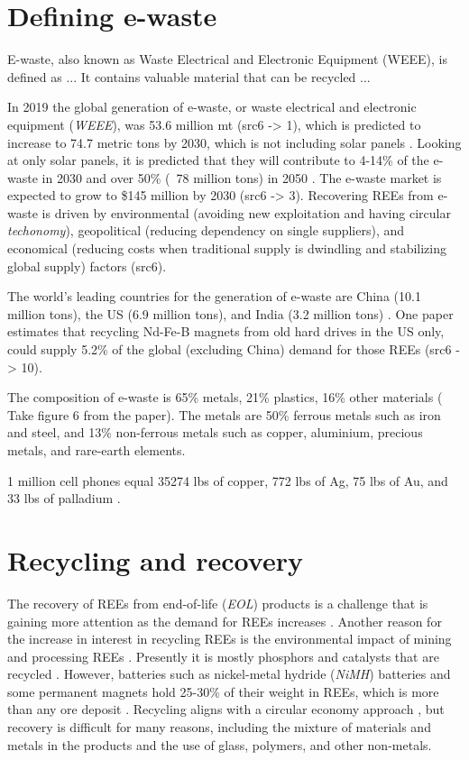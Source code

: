 
\section{Defining e-waste}

E-waste, also known as Waste Electrical and Electronic Equipment (WEEE), is defined as ... 
It contains valuable material that can be recycled ...

In 2019 the global generation of e-waste, or waste electrical and electronic equipment (\textit{WEEE}), was 53.6 million mt (src6 -> 1), which is predicted to increase to 74.7 metric tons by 2030, which is not including solar panels \cite{javed2024}. Looking at only solar panels, it is predicted that they will contribute to 4-14\% of the e-waste in 2030 and over 50\% (~78 million tons) in 2050 \cite{javed2024}. The e-waste market is expected to grow to \$145 million by 2030 (src6 -> 3). Recovering REEs from e-waste is driven by environmental (avoiding new exploitation and having circular \textit{techonomy}), geopolitical (reducing dependency on single suppliers), and economical (reducing costs when traditional supply is dwindling and stabilizing global supply) factors (src6).

The world's leading countries for the generation of e-waste are China (10.1 million tons), the US (6.9 million tons), and India (3.2 million tons) \cite{javed2024}. One paper estimates that recycling Nd-Fe-B magnets from old hard drives in the US only, could supply 5.2\% of the global (excluding China) demand for those REEs (src6 -> 10).

The composition of e-waste is 65\% metals, 21\% plastics, 16\% other materials (\cite{javed2024} Take figure 6 from the paper). The metals are 50\% ferrous metals such as iron and steel, and 13\% non-ferrous metals such as copper, aluminium, precious metals, and rare-earth elements. 

1 million cell phones equal 35274 lbs of copper, 772 lbs of Ag, 75 lbs of Au, and 33 lbs of palladium \cite{javed2024}.

\section{Recycling and recovery}

The recovery of REEs from end-of-life (\textit{EOL}) products is a challenge that is gaining more attention as the demand for REEs increases \cite{USDoE2024}. Another reason for the increase in interest in recycling REEs is the environmental impact of mining and processing REEs \cite{USDoE2024}. Presently it is mostly phosphors and catalysts that are recycled \cite{britannica2024}. However, batteries such as nickel-metal hydride (\textit{NiMH}) batteries and some permanent magnets hold 25-30\% of their weight in REEs, which is more than any ore deposit \cite{britannica2024}. Recycling aligns with a circular economy approach \cite{circular2016}, but recovery is difficult for many reasons, including the mixture of materials and metals in the products and the use of glass, polymers, and other non-metals.

